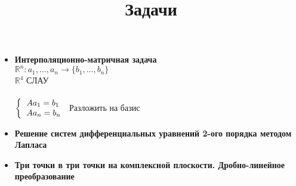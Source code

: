 \documentclass[12pt]{article}
\author{}
\begin{document}
\title{Задачи}
\date{}
\maketitle

\begin{itemize}
    \item \textbf{Интерполяционно-матричная задача} \\
    $\mathbb{R}^n: a_1, ..., a_n \rightarrow \{b_1, ..., b_n\}$ \\
    $\mathbb{R}^4$ СЛАУ \\\\
    $
    \bigg\{ 
      \begin{tabular}{l}
        \( A a_1 = b_1 \) \\
        \( A a_n = b_n \) \\
      \end{tabular}
    $
    Разложить на базис

    \item \textbf{Решение систем дифференциальных уравнений 2-ого порядка методом Лапласа}
    \item \textbf{Три точки в три точки на комплексной плоскости. Дробно-линейное преобразование}
\end{itemize}
\end{document}
